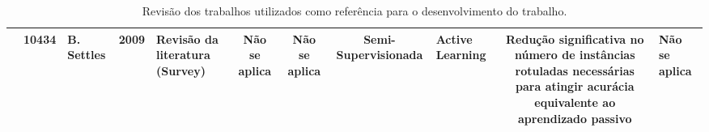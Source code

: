 \documentclass[a4paper,10pt, twocolumn]{article}
\begin{document}
\begin{table}[htbp]
\begin{adjustbox}{width=\textwidth}
\begin{tabular}{p{4cm} c p{3cm} c p{3cm} c c c p{4cm} c p{4cm}}
\cite{Settles2009Active} & 10434 & B. Settles & 2009 & Revisão da literatura (Survey) & Não se aplica & Não se aplica & Semi-Supervisionada & Active Learning & Redução significativa no número de instâncias rotuladas necessárias para atingir acurácia equivalente ao aprendizado passivo & Não se aplica \\


\bottomrule
\end{tabular}
\end{adjustbox}

\caption{Revisão dos trabalhos utilizados como referência para o desenvolvimento do trabalho.}
\end{table}
\end{document}
